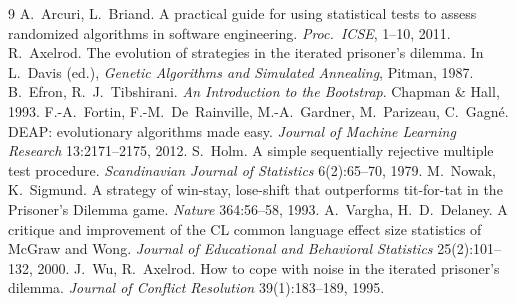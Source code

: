 \documentclass[10pt,a4paper]{article}
\begin{document}
\small
\begin{thebibliography}{9}\setlength{\itemsep}{0pt}\setlength{\parsep}{0pt}
 A.~Arcuri, L.~Briand. A practical guide for using statistical tests to assess randomized
  algorithms in software engineering. \emph{Proc.\ ICSE}, 1--10, 2011.
 R.~Axelrod. The evolution of strategies in the iterated prisoner's dilemma. In
  L.~Davis (ed.), \emph{Genetic Algorithms and Simulated Annealing}, Pitman, 1987.
 B.~Efron, R.~J.~Tibshirani. \emph{An Introduction to the Bootstrap}. Chapman \& Hall, 1993.
 F.-A.~Fortin, F.-M.~De~Rainville, M.-A.~Gardner, M.~Parizeau, C.~Gagné. DEAP: evolutionary
  algorithms made easy. \emph{Journal of Machine Learning Research} 13:2171--2175, 2012.
 S.~Holm. A simple sequentially rejective multiple test procedure. \emph{Scandinavian
  Journal of Statistics} 6(2):65--70, 1979.
 M.~Nowak, K.~Sigmund. A strategy of win-stay, lose-shift that outperforms tit-for-tat in
  the Prisoner's Dilemma game. \emph{Nature} 364:56--58, 1993.
 A.~Vargha, H.~D.~Delaney. A critique and improvement of the CL common language effect
  size statistics of McGraw and Wong. \emph{Journal of Educational and Behavioral Statistics} 25(2):101--132, 2000.
 J.~Wu, R.~Axelrod. How to cope with noise in the iterated prisoner's dilemma. \emph{Journal
  of Conflict Resolution} 39(1):183--189, 1995.
\end{thebibliography}
\end{document}
